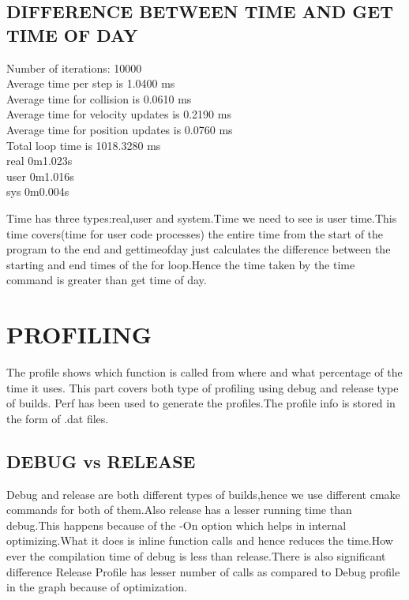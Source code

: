 \documentclass[11pt]{article}
\begin{document}
\subsection{DIFFERENCE BETWEEN TIME AND GET TIME OF DAY}
\begin{center}
Number of iterations: 10000\\
Average time per step is 1.0400 ms\\
Average time for collision is 0.0610 ms\\
Average time for velocity updates is 0.2190 ms\\
Average time for position updates is 0.0760 ms\\
Total loop time is 1018.3280 ms\\
real	0m1.023s\\
user	0m1.016s\\
sys	0m0.004s
\end{center}
Time has three types:real,user and system.Time we need to see is user time.This time covers(time for user code processes) the entire time from the start of the program to the end  and  gettimeofday  just calculates the difference between the starting and end times of the for loop.Hence the time taken by the time command is greater than get time of day. 
\section{PROFILING}
The profile shows which function is called from where and what percentage of the time it uses.
This part covers both type of profiling using debug and release type of builds.
Perf has been used to generate the profiles.The profile info is stored in the form of .dat files.
\subsection{DEBUG vs RELEASE}
Debug and release are both different types of builds,hence we use different cmake commands for both of them.Also release has a lesser running time than debug.This happens because  of the -On option which helps in internal optimizing.What it does is inline function calls and hence reduces the time.How ever the compilation time  of debug  is less than release.There is also significant difference 
Release Profile has lesser number of calls as compared to  Debug profile in the graph because of optimization.
\end{document}
